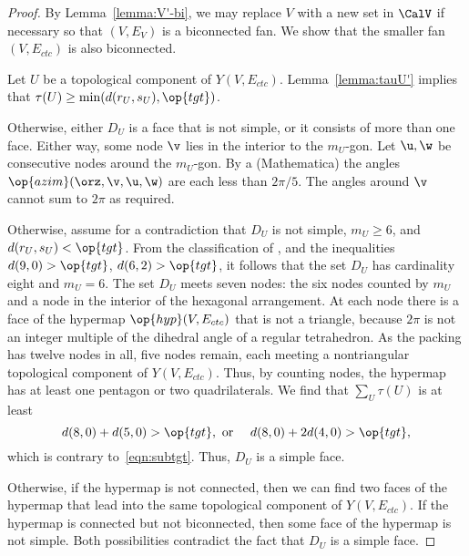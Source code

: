 \begin{proof}
  By Lemma~\ref{lemma:V'-bi}, we may replace $V$ with a new set in
  $\CalV$ if necessary so that $(V,E_V)$ is a biconnected fan.
   We  show that the smaller
  fan $(V,E_{ctc})$ is also biconnected.

  Let $U$ be a topological component of $Y(V,E_{ctc})$.  Lemma~\ref{lemma:tauU'}
   implies that $\tau(U)\ge \min(d(r_U,s_U),\op{tgt})$.

    Otherwise,
   either $D_U$ is a face that is not simple, or it consists of more than
   one face.  Either way, some node $\v$ lies in the interior to the
   $m_U$-gon.  Let $\u,\w$ be consecutive nodes around the $m_U$-gon.
   By a %
  {(Mathematica)} the angles
   $\op{azim}(\orz,\v,\u,\w)$ are each less than $2\pi/5$. The angles
   around $\v$ cannot sum to $2\pi$ as required.

     Otherwise, assume
   for a contradiction that $D_U$ is not simple, $m_U\ge 6$, and
   $d(r_U,s_U)<\op{tgt}$.  From the classification of
   \cite[p.~126,~Fig.~12.1]{Hales:2006:DCG}, and the inequalities
   $d(9,0) > \op{tgt}$, $d(6,2) > \op{tgt}$, it follows that the set
   $D_U$ has cardinality eight and $m_U=6$.  The set $D_U$ meets seven
   nodes: the six nodes counted by $m_U$ and a node in the interior of
   the hexagonal arrangement.  At each node there is a face of the
   hypermap $\op{hyp}(V,E_{ctc})$ that is not a triangle, because
   $2\pi$ is not an integer multiple of the dihedral angle of a
   regular tetrahedron.  As the packing has twelve nodes in all, five
   nodes remain, each meeting a nontriangular topological component of
   $Y(V,E_{ctc})$.  Thus, by counting nodes, the hypermap has at least
   one pentagon or two quadrilaterals.  We find that $\sum_{U}
   \tau(U)$ is at least
\[
d(8,0) + d(5,0) > \op{tgt}, \text{ or }\quad d(8,0) + 2 d(4,0) > \op{tgt},
\]
which is contrary to~\eqref{eqn:subtgt}.
Thus, $D_U$ is a simple face.
%
%

  Otherwise, if the hypermap is
not connected, then we can find two faces of the hypermap that lead
into the same topological component of $Y(V,E_{ctc})$.  If the
hypermap is connected but not biconnected, then some face of the
hypermap is not simple.  Both possibilities contradict the fact that
$D_U$ is a simple face.
\end{proof}



